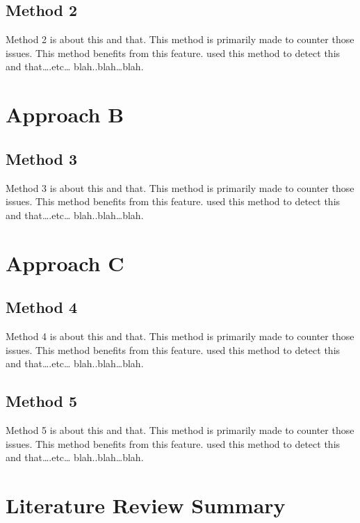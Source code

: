 \documentclass[12pt, twoside]{report}
\begin{document}
\subsection{Method 2}
Method 2 is about this and that. This method is primarily made to counter those issues. This method benefits  from this feature.  \cite{felzenszwalb2010cascade} used this method to detect this and that….etc… blah..blah…blah.

\section{Approach B}
\lipsum[1-1]
\subsection{Method 3}
Method 3 is about this and that. This method is primarily made to counter those issues. This method benefits  from this feature.  \cite{felzenszwalb2010cascade} used this method to detect this and that….etc… blah..blah…blah.

\section{Approach C}
\lipsum[1-1]
\subsection{Method 4}
Method 4 is about this and that. This method is primarily made to counter those issues. This method benefits  from this feature.  \cite{felzenszwalb2010cascade} used this method to detect this and that….etc… blah..blah…blah.
\subsection{Method 5}
Method 5 is about this and that. This method is primarily made to counter those issues. This method benefits  from this feature.  \cite{felzenszwalb2010cascade} used this method to detect this and that….etc… blah..blah…blah.

\section{Literature Review Summary}
\lipsum[3-5]


\end{document}
